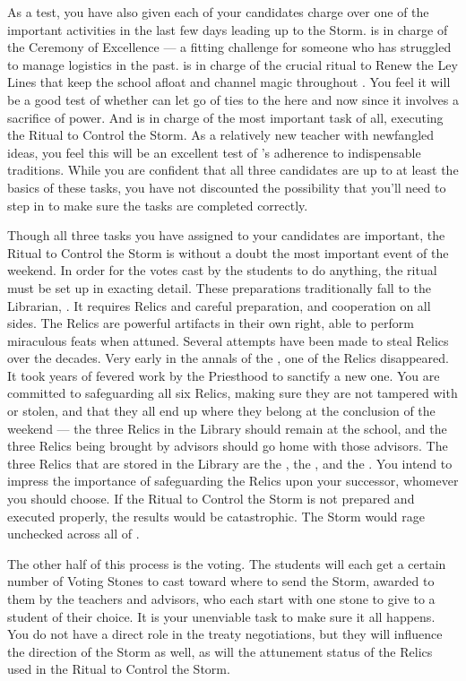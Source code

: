 \documentclass[char]{GL2020}
\begin{document}
As a test, you have also given each of your candidates charge over one of the important activities in the last few days leading up to the Storm. \cMusic{} is in charge of the Ceremony of Excellence — a fitting challenge for someone who has struggled to manage logistics in the past. \cBeetle{} is in charge of the crucial ritual to Renew the Ley Lines that keep the school afloat and channel magic throughout \pEarth{}. You feel it will be a good test of whether \cBeetle{\they} can let go of \cBeetle{\their} ties to the here and now since it involves a sacrifice of power. And \cChupSecond{} is in charge of the most important task of all, executing the Ritual to Control the Storm. As a relatively new teacher with newfangled ideas, you feel this will be an excellent test of \cChupSecond{}’s adherence to indispensable traditions. While you are confident that all three candidates are up to at least the basics of these tasks, you have not discounted the possibility that you'll need to step in to make sure the tasks are completed correctly.

Though all three tasks you have assigned to your candidates are important, the Ritual to Control the Storm is without a doubt the most important event of the weekend. In order for the votes cast by the students to do anything, the ritual must be set up in exacting detail. These preparations traditionally fall to the Librarian, \cLibrarian{\intro}. It requires Relics and careful preparation, and cooperation on all sides. The Relics are powerful artifacts in their own right, able to perform miraculous feats when attuned. Several attempts have been made to steal Relics over the decades. Very early in the annals of the \pSc{}, one of the \pFarm{} Relics disappeared. It took years of fevered work by the Priesthood to sanctify a new one. You are committed to safeguarding all six Relics, making sure they are not tampered with or stolen, and that they all end up where they belong at the conclusion of the weekend — the three Relics in the Library should remain at the school, and the three Relics being brought by advisors should go home with those advisors. The three Relics that are stored in the Library are the \iNet{}, the \iLariat{}, and the \iScythe{}. You intend to impress the importance of safeguarding the Relics upon your successor, whomever you should choose. If the Ritual to Control the Storm is not prepared and executed properly, the results would be catastrophic. The Storm would rage unchecked across all of \pEarth{}.

The other half of this process is the voting. The students will each get a certain number of Voting Stones to cast toward where to send the Storm, awarded to them by the teachers and advisors, who each start with one stone to give to a student of their choice. It is your unenviable task to make sure it all happens. You do not have a direct role in the treaty negotiations, but they will influence the direction of the Storm as well, as will the attunement status of the Relics used in the Ritual to Control the Storm. 
\end{document}
